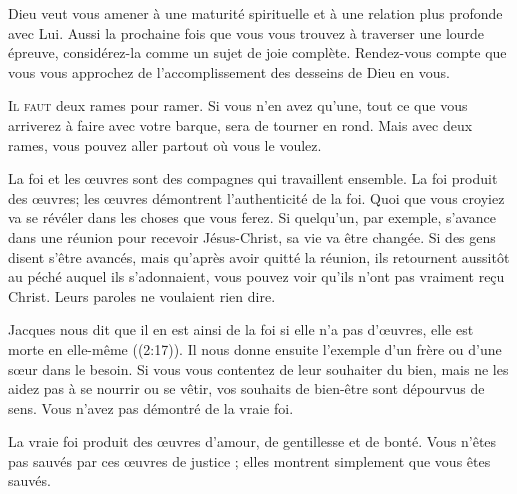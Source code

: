 Dieu veut vous amener à une maturité spirituelle et à une relation
 plus profonde avec Lui. Aussi la prochaine fois que vous vous trouvez
 à traverser une lourde épreuve, considérez-la 
 comme un sujet de joie complète.
 Rendez-vous compte que vous vous approchez de l'accomplissement
 des desseins de Dieu en vous. 

\dvrule






\lettrine{I}{l faut} deux rames pour ramer.
 Si vous n'en avez qu'une, tout ce que vous arriverez à faire
 avec votre barque, sera de tourner en rond.
 Mais avec deux rames, vous pouvez aller partout où vous le voulez. 

La foi et les \oe{}uvres sont des compagnes qui travaillent ensemble.
 La foi produit des \oe{}uvres; les \oe{}uvres démontrent l'authenticité de la foi.
 Quoi que vous croyiez va se révéler dans les choses que vous ferez.
 Si quelqu'un, par exemple, s'avance dans une réunion pour recevoir
 Jésus-Christ, sa vie va être changée. Si des gens disent s'être avancés,
 mais qu'après avoir quitté la réunion, ils retournent aussitôt au péché
 auquel ils s'adonnaient, vous pouvez voir qu'ils n'ont pas vraiment
 re\c{c}u Christ. Leurs paroles ne voulaient rien dire. 


Jacques nous dit que \Og il en est ainsi de la foi\frcolon{} si elle n'a pas d'\oe{}uvres,
 elle est morte en elle-même \Fg{} ((2:17)).
 Il nous donne ensuite l'exemple d'un frère ou d'une s\oe{}ur dans le besoin.
 Si vous vous contentez de leur souhaiter du bien, mais ne les aidez pas
 à se nourrir ou se vêtir, vos souhaits de bien-être sont dépourvus de sens.
 Vous n'avez pas démontré de la vraie foi. 

La vraie foi produit des \oe{}uvres d'amour, de gentillesse et de bonté.
 Vous n'êtes pas sauvés par ces \oe{}uvres de justice ;
 elles montrent simplement que vous êtes sauvés. 


